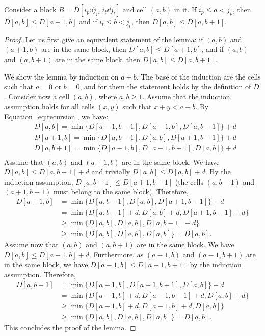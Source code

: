 \begin{lemma}
\label{lm:non-decreasing}
Consider a block $B = D[i_p\dd j_p, i_t \dd j_t]$ and cell $(a,b)$ in it. If $i_p \leq a < j_p$, then $D[a,b] \le D[a+1,b]$ and if $i_t \leq b < j_t$, then $D[a,b] \le D[a,b+1]$.
\end{lemma}
\begin{proof}
    Let us first give an equivalent statement of the lemma: if $(a,b)$ and $(a+1,b)$ are in the same block, then $D[a,b] \le D[a+1,b]$, and if $(a,b)$ and $(a,b+1)$ are in the same block, then $D[a,b] \le D[a,b+1]$. 
    
    We show the lemma by induction on $a+b$. The base of the induction are the cells such that $a = 0$ or $b = 0$, and for them the statement holds by the definition of $D$. Consider now a cell $(a,b)$, where $a,b \ge 1$. Assume that the induction assumption holds for all cells $(x,y)$ such that $x+y < a+b$. By Equation~\ref{eq:recursion}, we have:
    \begin{align*}
    &D[a, b] = \min \{ D[a-1, b-1], D[a-1, b], D[a, b-1]\} +d\\
    &D[a+1, b] = \min \{ D[a, b-1], D[a, b], D[a+1, b-1]\} + d\\
    &D[a, b+1] = \min \{ D[a-1, b], D[a-1, b+1], D[a, b]\} + d\\
    \end{align*}
    Assume that $(a,b)$ and $(a+1,b)$ are in the same block. 
    We have $D[a,b] \leq D[a, b-1]+d$ and trivially $D[a,b] \leq D[a,b] + d$.
    By the induction assumption, $D[a,b-1] \leq D[a+1,b-1]$ (the cells $(a,b-1)$ and $(a+1,b-1)$ must belong to the same block).
    Therefore, 
    \begin{align*}
    D[a+1,b] & = \min \{ D[a, b-1], D[a, b], D[a+1, b-1]\} + d \\
    & = \min \{ D[a, b-1] + d, D[a, b] + d, D[a+1, b-1] + d\} \\
    & \ge \min \{D[a,b], D[a,b], D[a,b-1]+d\} \\
    & \ge \min\{D[a,b], D[a,b], D[a,b]\} = D[a,b]. 
    \end{align*}
    Assume now that $(a,b)$ and $(a,b+1)$ are in the same block.
    We have $D[a,b] \leq D[a-1, b]+d$. Furthermore, as $(a-1,b)$ and $(a-1,b+1)$ are in the same block, we have $D[a-1,b] \leq D[a-1,b+1]$ by the induction assumption. Therefore,
    \begin{align*}
    D[a,b+1] & = \min \{ D[a-1, b], D[a-1, b+1], D[a, b]\} + d\\
    & = \min \{ D[a-1, b] + d, D[a-1, b+1] + d, D[a, b] + d\}\\
    & \ge \min \{D[a-1,b]+d, D[a-1,b]+d, D[a,b]\}\\ 
    & \ge \min\{D[a,b], D[a,b], D[a,b]\} = D[a,b]. 
    \end{align*}
    This concludes the proof of the lemma.
\end{proof}


